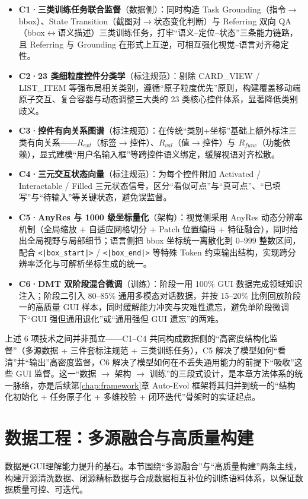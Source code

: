 \begin{itemize}
  \item \textbf{C1·三类训练任务联合监督}（数据侧）：同时构造 Task Grounding（指令$\rightarrow$bbox）、State Transition（截图对$\rightarrow$状态变化判断）与 Referring 双向 QA（bbox$\leftrightarrow$语义描述）三类训练任务，打牢“语义--定位--状态”三条能力链路，且 Referring 与 Grounding 在形式上互逆，可相互强化视觉--语言对齐稳定性。
  \item \textbf{C2·23 类细粒度控件分类学}（标注规范）：剔除 CARD\_VIEW / LIST\_ITEM 等强布局相关类别，遵循“原子粒度优先”原则，构建覆盖移动端原子交互、复合容器与动态调整三大类的 23 类核心控件体系，显著降低类别歧义。
  \item \textbf{C3·控件有向关系图谱}（标注规范）：在传统“类别+坐标”基础上额外标注三类有向关系——$R_{ext}$（标签$\rightarrow$控件）、$R_{val}$（值$\rightarrow$控件）与 $R_{func}$（功能依赖），显式建模“用户名输入框”等跨控件语义绑定，缓解视语对齐松散。
  \item \textbf{C4·三元交互状态向量}（标注规范）：为每个控件附加 Activated / Interactable / Filled 三元状态信号，区分“看似可点”与“真可点”、“已填写”与“待输入”等关键状态，避免误监督。
  \item \textbf{C5·AnyRes 与 1000 级坐标量化}（架构）：视觉侧采用 AnyRes 动态分辨率机制（全局缩放 + 自适应网格切分 + Patch 位置编码 + 特征融合），同时给出全局视野与局部细节；语言侧把 bbox 坐标统一离散化到 $0\text{--}999$ 整数区间，配合 \texttt{<|box\_start|>} / \texttt{<|box\_end|>} 等特殊 Token 约束输出结构，实现跨分辨率泛化与可解析坐标生成的统一。
  \item \textbf{C6·DMT 双阶段混合微调}（训练）：阶段一用 100\% GUI 数据完成领域知识注入；阶段二引入 80--85\% 通用多模态对话数据，并按 15--20\% 比例回放阶段一的高质量 GUI 样本，同时缓解能力冲突与灾难性遗忘，避免单阶段微调下“GUI 强但通用退化”或“通用强但 GUI 遗忘”的两难。
\end{itemize}

上述 6 项技术之间并非孤立——C1--C4 共同构成数据侧的“高密度结构化监督”（多源数据 + 三件套标注规范 + 三类训练任务），C5 解决了模型如何“看清”并“输出”高密度监督，C6 解决了模型如何在不丢失通用能力的前提下“吸收”这些 GUI 监督。这一“数据 $\rightarrow$ 架构 $\rightarrow$ 训练”的三段式设计，是本章方法体系的统一脉络，亦是后续第\ref{chap:framework}章 Auto-Evol 框架将其归并到统一的“结构化初始化 + 任务原子化 + 多维校验 + 闭环迭代”骨架时的实证起点。

\section{数据工程：多源融合与高质量构建}
数据是GUI理解能力提升的基石。本节围绕“多源融合”与“高质量构建”两条主线，构建开源清洗数据、闭源精标数据与合成数据相互补位的训练语料体系，以保证数据质量可控、可迭代。

